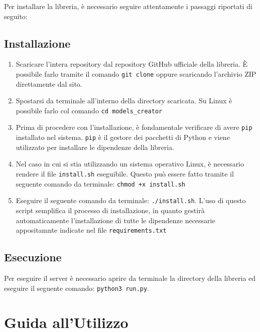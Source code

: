 \documentclass{rapportECL}
\newcommand{\rootDirectory}{models\_creator}
\begin{document}
Per installare la libreria, è necessario seguire attentamente i passaggi riportati di seguito:

\section*{Installazione}
\begin{enumerate}
  \item Scaricare l'intera repository dal repository GitHub ufficiale della libreria. 
  È possibile farlo tramite il comando \texttt{git clone} oppure scaricando l'archivio ZIP direttamente dal sito.
  \item Spostarsi da terminale all'interno della directory scaricata. Su Linux è possibile farlo col comando \texttt{cd \rootDirectory}
  \item Prima di procedere con l'installazione, è fondamentale verificare di avere \texttt{pip} installato nel sistema. 
  \texttt{pip} è il gestore dei pacchetti di Python e viene utilizzato per installare le dipendenze della libreria.
  \item Nel caso in cui si stia utilizzando un sistema operativo Linux, è necessario rendere il file \texttt{install.sh} eseguibile. 
  Questo può essere fatto tramite il seguente comando da terminale: \texttt{chmod +x install.sh}
  \item Eseguire il seguente comando da terminale: \texttt{./install.sh}. L'uso di questo script semplifica il processo di installazione, 
  in quanto gestirà automaticamente l'installazione di tutte le dipendenze necessarie appositamnte indicate nel file \texttt{requirements.txt}
\end{enumerate}

\section*{Esecuzione}
Per eseguire il server è necessario aprire da terminale la directory della libreria ed eseguire
il seguente comando: \texttt{python3 run.py}.



\chapter{Guida all'Utilizzo}
\label{cha:guida}
\end{document}
